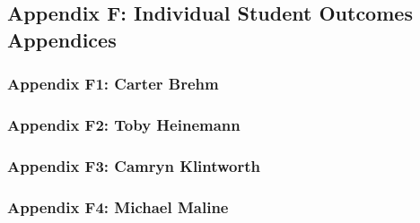 \documentclass[12pt]{article}
\begin{document}
\subsection{Appendix F: Individual Student Outcomes Appendices}
\subsubsection{Appendix F1: Carter Brehm}
\subsubsection{Appendix F2: Toby Heinemann}
\subsubsection{Appendix F3: Camryn Klintworth}
\subsubsection{Appendix F4: Michael Maline}

\newpage
\end{document}
